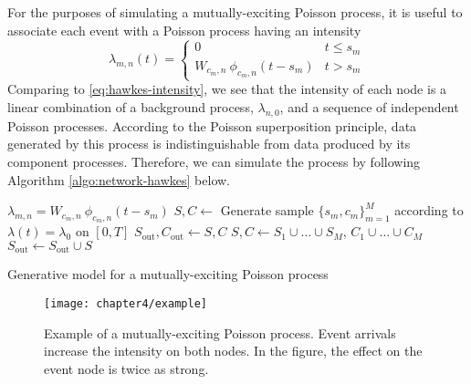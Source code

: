 		For the purposes of simulating a mutually-exciting Poisson process, it is useful to associate each event with a Poisson process having an intensity
		\begin{equation}
			\lambda_{m,n}(t) = \begin{cases}
						             0 & t \le s_m \\
						             W_{c_m, n} \ \phi_{c_m, n}(t - s_m) & t > s_m
						      		 \end{cases}
		\end{equation}
		Comparing to \eqref{eq:hawkes-intensity}, we see that the intensity of each node is a linear combination of a background process, $\lambda_{n,0}$, and a sequence of independent Poisson processes. According to the Poisson superposition principle, data generated by this process is indistinguishable from data produced by its component processes. Therefore, we can simulate the process by following Algorithm \ref{algo:network-hawkes} below.

		\begin{algorithm}
				\begin{algorithmic}
					\vspace{1mm}
					\STATE $\lambda_{m,n} = W_{c_m,n} \ \phi_{c_m,n}(t - s_m)$
					\STATE $S, C \gets$ Generate sample $\{s_m, c_m\}_{m=1}^M$ according to $\lambda(t) = \lambda_0$ on $[0, T]$
					\STATE $S_{\text{out}}, C_{\text{out}} \gets S, C$
					\REPEAT
						\ENDFOR
						\STATE $S, C \gets S_1 \cup \dots \cup S_M$, $C_1 \cup \dots \cup C_M$
						\STATE $S_{\text{out}} \gets S_{\text{out}} \cup S$
			\end{algorithmic}
			\caption{Generative model for a mutually-exciting Poisson process}
			\label{algo:network-hawkes}
		\end{algorithm}

		\begin{figure}[t]
			\small
			\linespread{1}
			\centering
			\label{fig:example_chapter4}
			\texttt{[image: chapter4/example]}
			\captionsetup{skip=-20pt, labelsep=colon, font=footnotesize, width=\linewidth}
			\caption[Example of a mutually-exciting Poisson process.]{Example of a mutually-exciting Poisson process. Event arrivals increase the intensity on both nodes. In the figure, the effect on the event node is twice as strong.}
		\end{figure}

